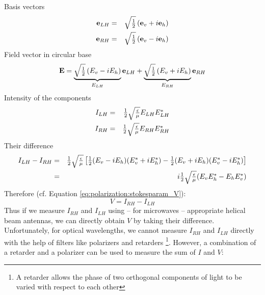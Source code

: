 Basis vectors
\begin{eqnarray}
  \label{eq:polarization:e_Lh}
  \mathbf{e}_{LH} &=& \sqrt{\textstyle\frac{1}{2}} \left( \mathbf{e}_v + i\mathbf{e}_h \right) \\
  \label{eq:polarization:e_Rh}
  \mathbf{e}_{RH} &=& \sqrt{\textstyle\frac{1}{2}} \left( \mathbf{e}_v - i\mathbf{e}_h \right) 
\end{eqnarray}
%
Field vector in circular base
\begin{equation}
  \label{eq:polarization:E_circbase}
  \mathbf{E} = \underbrace{
               \sqrt{\textstyle\frac{1}{2}}\left(E_v -  i E_h \right)}_{E_{LH}} 
               \mathbf{e}_{LH} 
              + \underbrace{
               \sqrt{\textstyle\frac{1}{2}}\left(E_v +  i E_h \right)}_{E_{RH}} 
               \mathbf{e}_{RH} 
\end{equation}
%
Intensity of the components
\begin{eqnarray}
  \label{eq:polarization:ILH}
  I_{LH} &=& \textstyle\frac{1}{2}\sqrt{\textstyle{\frac{\epsilon}{\mu}}} E_{LH} E_{LH}^\ast\\
  \label{eq:polarization:IRH}
  I_{RH} &=& \textstyle\frac{1}{2}\sqrt{\textstyle{\frac{\epsilon}{\mu}}} E_{RH} E_{RH}^\ast
\end{eqnarray}
%
Their difference
\begin{eqnarray}
   I_{LH} -  I_{RH}
   &=&
     \textstyle\frac{1}{2}\sqrt{\textstyle{\frac{\epsilon}{\mu}}} \left[
     \textstyle\frac{1}{2} (E_v - i E_h) (E_v^\ast + i E_h^\ast)
    - \textstyle\frac{1}{2} (E_v + i E_h) (E_v^\ast - i E_h^\ast)\right]\\ \nonumber
   &=&
   i \textstyle\frac{1}{2}\sqrt{\textstyle{\frac{\epsilon}{\mu}}} (E_v E_h^\ast -  E_h E_v^\ast)
  \label{eq:polarization:Idiff_circbase}
\end{eqnarray}
Therefore (cf. Equation \ref{eq:polarization:stokesparam_V}):
\begin{equation}
  \label{eq:polarization:V_Idiff}
  V =   I_{RH} -  I_{LH}
\end{equation}
%
Thus if we measure $I_{RH}$ and $I_{LH}$ using -- for microwaves --
appropriate helical beam antennas, we can directly obtain $V$ by
taking their difference.  Unfortunately, for optical wavelengths, we
cannot measure $I_{RH}$ and $I_{LH}$ directly with the help of
filters like  polarizers and retarders%
\footnote{A retarder allows the phase of two orthogonal components 
of light to be varied  with respect to each other}.  
However, a combination of a retarder and a polarizer can be used
to measure the sum of $I$ and $V$:


